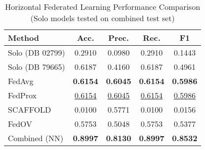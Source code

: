 \begin{table}[ht]
  \centering
  \caption{Horizontal Federated Learning Performance Comparison (Solo models tested on combined test set)}
  \label{tab:horizontal_fl_comparison}
  \begin{tabular}{lcccc}
  \toprule
  \textbf{Method} & \textbf{Acc.} & \textbf{Prec.} & \textbf{Rec.} & \textbf{F1} \\
  \midrule
  Solo (DB 02799) & 0.2910 & 0.0980 & 0.2910 & 0.1443 \\
  Solo (DB 79665) & 0.6187 & 0.4160 & 0.6187 & 0.4961 \\
  \midrule
  FedAvg & \textbf{0.6154} & \textbf{0.6045} & \textbf{0.6154} & \textbf{0.5986} \\
  FedProx & \underline{0.6154} & \underline{0.6045} & \underline{0.6154} & \underline{0.5986} \\
  SCAFFOLD & 0.0100 & 0.5771 & 0.0100 & 0.0156 \\
  FedOV & 0.5753 & 0.5048 & 0.5753 & 0.5377 \\
  \midrule
  Combined (NN) & \textbf{0.8997} & \textbf{0.8130} & \textbf{0.8997} & \textbf{0.8532} \\
  \bottomrule
  \end{tabular}
\end{table}